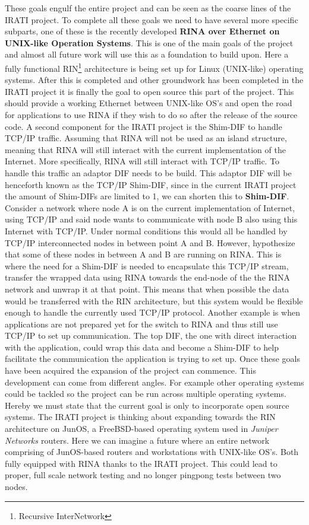 These goals engulf the entire project and can be seen as the coarse lines of the IRATI project. To complete all these goals we need to have several more specific subparts, one of these is the recently developed \textbf{RINA over Ethernet on UNIX-like Operation Systems}. This is one of the main goals of the project and almost all future work will use this as a foundation to build upon. Here a fully functional RIN\footnote{Recursive InterNetwork} architecture is being set up for Linux (UNIX-like) operating systems. After this is completed and other groundwork has been completed in the IRATI project it is finally the goal to open source this part of the project. This should provide a working Ethernet between UNIX-like OS's and open the road for applications to use RINA if they wish to do so after the release of the source code. 
\npar
A second component for the IRATI project is the Shim-DIF to handle TCP/IP traffic. Assuming that RINA will not be used as an island structure, meaning that RINA will still interact with the current implementation of the Internet. More specifically, RINA will still interact with TCP/IP traffic. To handle this traffic an adaptor DIF needs to be build. This adaptor DIF will be henceforth known as the TCP/IP Shim-DIF, since in the current IRATI project the amount of Shim-DIFs are limited to 1, we can shorten this to \textbf{Shim-DIF}. Consider a network where node A is on the current implementation of Internet, using TCP/IP and said node wants to communicate with node B also using this Internet with TCP/IP. Under normal conditions this would all be handled by TCP/IP interconnected nodes in between point A and B. However, hypothesize that some of these nodes in between A and B are running on RINA. This is where the need for a Shim-DIF is needed to encapsulate this TCP/IP stream, transfer the wrapped data using RINA towards the end-node of the the RINA network and unwrap it at that point. This means that when possible the data would be transferred with the RIN architecture, but this system would be flexible enough to handle the currently used TCP/IP protocol. Another example is when applications are not prepared yet for the switch to RINA and thus still use TCP/IP to set up communication. The top DIF, the one with direct interaction with the application, could wrap this data and become a Shim-DIF to help facilitate the communication the application is trying to set up. 
\npar
Once these goals have been acquired the expansion of the project can commence. This development can come from different angles. For example other operating systems could be tackled so the project can be run across multiple operating systems. Hereby we must state that the current goal is only to incorporate open source systems. The IRATI project is thinking about expanding towards the RIN architecture on JunOS, a FreeBSD-based operating system used in \emph{Juniper Networks \citep{website:junos}} routers. Here we can imagine a future where an entire network comprising of JunOS-based routers and workstations with UNIX-like OS's. Both fully equipped with RINA thanks to the IRATI project. This could lead to proper, full scale network testing and no longer pingpong tests between two nodes. 
